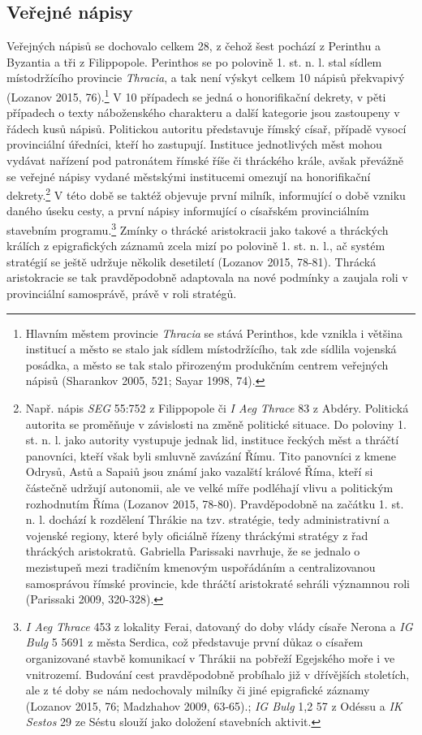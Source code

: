 
\subsection[veřejné-nápisy-11]{Veřejné nápisy}

Veřejných nápisů se dochovalo celkem 28, z čehož šest pochází z Perinthu a Byzantia a tři z Filippopole. Perinthos se po polovině 1. st. n. l. stal sídlem místodržícího provincie {\em Thracia}, a tak není výskyt celkem 10 nápisů překvapivý (Lozanov 2015, 76).\footnote{Hlavním městem provincie {\em Thracia} se stává Perinthos, kde vznikla i většina institucí a město se stalo jak sídlem místodržícího, tak zde sídlila vojenská posádka, a město se tak stalo přirozeným produkčním centrem veřejných nápisů (Sharankov 2005, 521; Sayar 1998, 74).} V 10 případech se jedná o honorifikační dekrety, v pěti případech o texty náboženského charakteru a další kategorie jsou zastoupeny v řádech kusů nápisů. Politickou autoritu představuje římský císař, případě vysocí provinciální úředníci, kteří ho zastupují. Instituce jednotlivých měst mohou vydávat nařízení pod patronátem římské říše či thráckého krále, avšak převážně se veřejné nápisy vydané městskými institucemi omezují na honorifikační dekrety.\footnote{Např. nápis {\em SEG} 55:752 z Filippopole či {\em I Aeg Thrace} 83 z Abdéry. Politická autorita se proměňuje v závislosti na změně politické situace. Do poloviny 1. st. n. l. jako autority vystupuje jednak lid, instituce řeckých měst a thráčtí panovníci, kteří však byli smluvně zavázání Římu. Tito panovníci z kmene Odrysů, Astů a Sapaiů jsou známí jako vazalští králové Říma, kteří si částečně udržují autonomii, ale ve velké míře podléhají vlivu a politickým rozhodnutím Říma (Lozanov 2015, 78-80). Pravděpodobně na začátku 1. st. n. l. dochází k rozdělení Thrákie na tzv. stratégie, tedy administrativní a vojenské regiony, které byly oficiálně řízeny thráckými stratégy z řad thráckých aristokratů. Gabriella Parissaki navrhuje, že se jednalo o mezistupeň mezi tradičním kmenovým uspořádáním a centralizovanou samosprávou římské provincie, kde thráčtí aristokraté sehráli významnou roli (Parissaki 2009, 320-328).} V této době se taktéž objevuje první milník, informující o době vzniku daného úseku cesty, a první nápisy informující o císařském provinciálním stavebním programu.\footnote{{\em I Aeg Thrace} 453 z lokality Ferai, datovaný do doby vlády císaře Nerona a {\em IG Bulg} 5 5691 z města Serdica, což představuje první důkaz o císařem organizované stavbě komunikací v Thrákii na pobřeží Egejského moře i ve vnitrozemí. Budování cest pravděpodobně probíhalo již v dřívějších stoletích, ale z té doby se nám nedochovaly milníky či jiné epigrafické záznamy (Lozanov 2015, 76; Madzhahov 2009, 63-65).; {\em IG Bulg} 1,2 57 z Odéssu a {\em IK Sestos} 29 ze Séstu slouží jako doložení stavebních aktivit.} Zmínky o thrácké aristokracii jako takové a thráckých králích z epigrafických záznamů zcela mizí po polovině 1. st. n. l., ač systém stratégií se ještě udržuje několik desetiletí (Lozanov 2015, 78-81). Thrácká aristokracie se tak pravděpodobně adaptovala na nové podmínky a zaujala roli v provinciální samosprávě, právě v roli stratégů.

